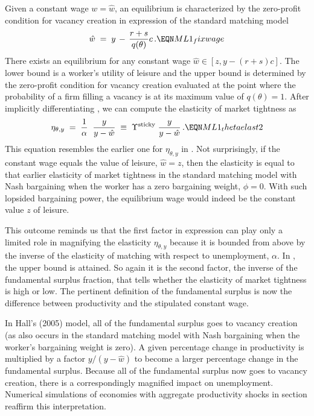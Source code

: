 Given a constant wage $w=\hat w$, an equilibrium is 
characterized by the zero-profit condition for vacancy creation
in expression  of the standard matching model
$$
\hat w\;=\; y \,-\, {r+s \over q(\theta)} c \,.      \EQN ML1_fixwage
$$
There exists an equilibrium for any constant wage
$\hat w \in [z, y-(r+s)c]$. The lower bound
is a worker's utility of leisure and the upper bound
is determined by the zero-profit condition for vacancy
creation evaluated at the  point where the  probability of a firm filling a vacancy
is at its maximum value of $q(\theta)=1$.
After implicitly differentiating ,
we can compute the elasticity of market tightness as
$$
\eta_{\theta,y}
\;=\; { 1 \over \alpha } \;\; {y \over y-\hat w}
\;\equiv\; \Upsilon^{\rm sticky}\; {y \over y-\hat w}\,.
                                                \EQN ML1_thetaelast2
$$
This equation resembles the earlier one for $\eta_{\theta,y}$  in
. Not surprisingly, if the constant wage
 equals the value of leisure, $\hat w = z$, then the
elasticity  is equal to that earlier
elasticity of market tightness in the standard
matching model with Nash bargaining when the worker has a zero
bargaining weight, $\phi=0$. With such lopsided
bargaining power, the equilibrium wage would indeed be the constant
value $z$ of leisure.

This outcome reminds us that the first factor in
expression  can play only a limited role in magnifying
the elasticity $\eta_{\theta,y}$ because it is bounded from above by the inverse of
the elasticity of matching with respect to unemployment, $\alpha$.   In
,  the upper bound is attained.
So again it is the second factor, the inverse of the fundamental
surplus fraction, that tells whether the elasticity
of market tightness is high or low. The pertinent definition of
the fundamental surplus is now the difference between productivity and
the stipulated constant wage.

In Hall's (2005) model, all
of the fundamental surplus goes to vacancy creation (as also occurs  in the
standard matching model with Nash
bargaining when  the worker's
bargaining weight is zero). A given percentage
change in productivity is multiplied  by a factor  \hbox{$y/(y-\hat w)$}
to become a larger percentage
change in the fundamental surplus.
Because all of the fundamental surplus now goes to vacancy creation, there
is a correspondingly magnified impact on unemployment. Numerical simulations of economies with aggregate
productivity shocks in section  reaffirm this interpretation.



